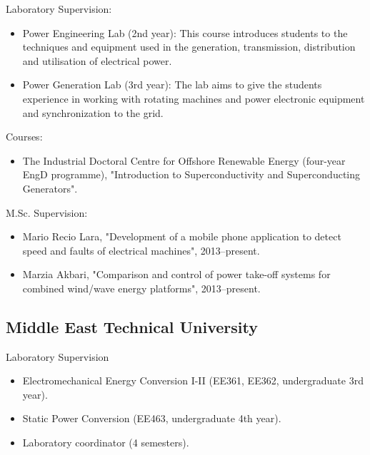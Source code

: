 \documentclass[a4paper,12pt]{article}
\begin{document}
Laboratory Supervision:
\begin{itemize}
\item Power Engineering Lab (2nd year): This course introduces students to the techniques and equipment used in the generation, transmission, distribution and utilisation of electrical power.
\item Power Generation Lab (3rd year): The lab aims to give the students experience in working with rotating machines and power electronic equipment and synchronization to the grid. 

\end{itemize}

Courses:
\begin{itemize}
\item The Industrial Doctoral Centre for Offshore Renewable Energy (four-year EngD programme), "Introduction to Superconductivity and Superconducting Generators".
\end{itemize}


M.Sc. Supervision:
\begin{itemize}
\item Mario Recio Lara, "Development of a mobile phone application to detect speed and faults of electrical machines", 2013--present.
\item Marzia Akbari, "Comparison and control of power take-off systems for combined wind/wave energy platforms", 2013--present.
\end{itemize}



\subsection{Middle East Technical University}
Laboratory Supervision
\begin{itemize}
\item Electromechanical Energy Conversion I-II (EE361, EE362, undergraduate 3rd year).
\item Static Power Conversion (EE463, undergraduate 4th year).
\item Laboratory coordinator (4 semesters). 
\end{itemize}
\end{document}
